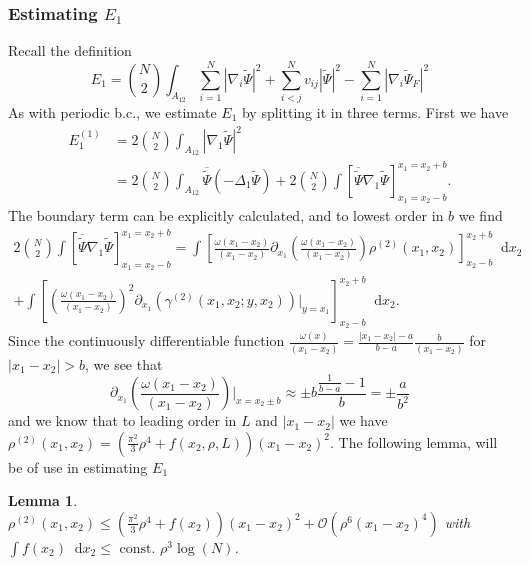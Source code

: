 \documentclass[a4paper,11pt]{article}
\newcommand{\abs}[1]{\left\lvert #1 \right\rvert}
\newcommand*\diff{\mathop{}\!\mathrm{d}}
\newtheorem{lemma}{Lemma}
\numberwithin{equation}{section}
\begin{document}
	\subsubsection{Estimating $ E_1 $}
		Recall the definition \begin{equation}
		E_1=\binom{N}{2}\int_{A_{12}} \sum_{i=1}^{N}\abs{\nabla_i\tilde{\Psi}}^2+\sum_{i<j}^{N}v_{ij}\abs{\tilde{\Psi}}^2-\sum_{i=1}^{N}\abs{\nabla_i\tilde{\Psi}_F}^2
		\end{equation}
		As with periodic b.c., we estimate $ E_1 $ by splitting it in three terms. First we have \begin{equation}
		\begin{aligned}
		E_1^{(1)}&=2\binom{N}{2}\int_{A_{12}}\abs{\nabla_1\tilde{\Psi}}^2\\&
		=2\binom{N}{2}\int_{A_{12}}\overline{\tilde{\Psi}}\left( -\Delta_1 \tilde{\Psi} \right)+2\binom{N}{2}\int\left[\overline{\tilde{\Psi}}\nabla_1\tilde{\Psi}\right]_{x_1=x_2-b}^{x_1=x_2+b}.
		\end{aligned}
		\end{equation}
		The boundary term can be explicitly calculated, and to lowest order in $ b $ we find \begin{equation}
		\begin{aligned}
		2\binom{N}{2}\int\left[\overline{\tilde{\Psi}}\nabla_1\tilde{\Psi}\right]_{x_1=x_2-b}^{x_1=x_2+b}=\int\left[\frac{\omega(x_1-x_2)}{(x_1-x_2)}\partial_{x_1}\left(\frac{\omega(x_1-x_2)}{(x_1-x_2)}\right)\rho^{(2)}(x_1,x_2)\right]_{x_2-b}^{x_2+b}\diff x_2\\+\int\left[\left(\frac{\omega(x_1-x_2)}{(x_1-x_2)}\right)^2\partial_{x_1}\left(\gamma^{(2)}(x_1,x_2;y,x_2)\right)\bigg\vert_{y=x_1}\right]_{x_2-b}^{x_2+b}\diff x_2.
		\end{aligned}
		\end{equation}
		Since the continuously differentiable function $ \frac{\omega(x)}{(x_1-x_2)}=\frac{\abs{x_1-x_2}-a}{b-a}\frac{b}{(x_1-x_2)} $ for $ \abs{x_1-x_2}>b $, we see that \begin{equation}
		\partial_{x_1}\left(\frac{\omega(x_1-x_2)}{(x_1-x_2)}\right)\bigg\vert_{x=x_2\pm b}\approx\pm b\frac{\frac{1}{b-a}-1}{ b}=\pm\frac{a}{b^2}
		\end{equation}
		and we know that to leading order in $ L $ and $ \abs{x_1-x_2} $ we have $ \rho^{(2)}(x_1,x_2)=(\frac{\pi^2}{3}\rho^4+f(x_2,\rho,L)) (x_1-x_2)^2 $. The following lemma, will be of use in estimating $ E_1 $
		\begin{lemma}\label{Lemma rho2 bound}
			$ \rho^{(2)}(x_1,x_2)\leq\left(\frac{\pi^2}{3}\rho^4+f(x_2)\right)(x_1-x_2)^2+\mathcal{O}(\rho^6(x_1-x_2)^4) $ with $ \int f(x_2)\diff x_2\leq \text{ const. }\rho^3\log(N) $.
		\end{lemma}
\end{document}
